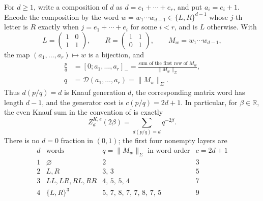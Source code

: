 \begin{lemma}
\label{lem:continued-fraction-knauf-normalization}
For \(d\ge1\), write a composition of \(d\) as
\(d=e_1+\cdots+e_r\), and put \(a_i=e_i+1\).  Encode the composition by the
word \(w=w_1\cdots w_{d-1}\in\{L,R\}^{d-1}\) whose \(j\)-th letter is \(R\)
exactly when \(j=e_1+\cdots+e_i\) for some \(i<r\), and is \(L\) otherwise.
With
\[
 L=\begin{pmatrix}1&0\\1&1\end{pmatrix},\qquad
 R=\begin{pmatrix}1&1\\0&1\end{pmatrix},\qquad M_w=w_1\cdots w_{d-1},
\]
the map \((a_1,\ldots,a_r)\mapsto w\) is a bijection, and
\begin{equation}
 \begin{aligned}
 \frac pq&=[0;a_1,\ldots,a_r]_-=
 \frac{\text{sum of the first row of }M_w}{\|M_w\|_\Sigma},\\
 q&=\mathcal D(a_1,\ldots,a_r)=\|M_w\|_\Sigma.
 \end{aligned}
 \label{eq:negative-cf-word-bijection}
\end{equation}
Thus \(d(p/q)=d\) is Knauf generation \(d\), the corresponding matrix word
has length \(d-1\), and the generator cost is \(c(p/q)=2d+1\).  In particular,
for \(\beta\in\mathbb R\), the even Knauf sum in the convention of
\cite[Sec.~IV]{FialaKlebanOzluk2003} is exactly
\[
 Z^{K,e}_d(2\beta)
 =\sum_{d(p/q)=d}q^{-2\beta}.
\]
There is no \(d=0\) fraction in \((0,1)\); the first four nonempty layers are
\[
\begin{array}{c|c|c|c}
d&\text{words}&q=\|M_w\|_\Sigma\text{ in word order}&c=2d+1\\ \hline
1&\varnothing&2&3\\
2&L,R&3,\,3&5\\
3&LL,LR,RL,RR&4,\,5,\,5,\,4&7\\
4&\{L,R\}^3&5,\,7,\,8,\,7,\,7,\,8,\,7,\,5&9
\end{array}
\]
\end{lemma}

